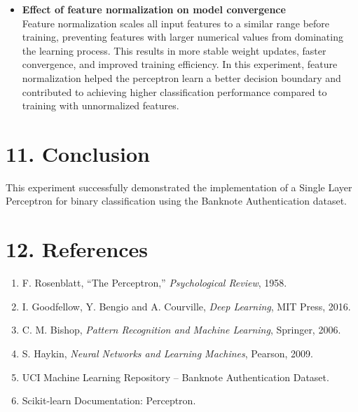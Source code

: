 \documentclass[11pt]{article}
\begin{document}
\begin{itemize}
    \item {\textbf{Effect of feature normalization on model convergence}}\\
    Feature normalization scales all input features to a similar range before training, preventing features with larger numerical values from dominating the learning process. This results in more stable weight updates, faster convergence, and improved training efficiency. In this experiment, feature normalization helped the perceptron learn a better decision boundary and contributed to achieving higher classification performance compared to training with unnormalized features.
\end{itemize}


\section*{11. Conclusion}

This experiment successfully demonstrated the implementation of a Single Layer Perceptron for binary classification using the Banknote Authentication dataset.

\section*{12. References}

\begin{enumerate}
\item F. Rosenblatt, ``The Perceptron,'' \emph{Psychological Review}, 1958.
\item I. Goodfellow, Y. Bengio and A. Courville, \emph{Deep Learning}, MIT Press, 2016.
\item C. M. Bishop, \emph{Pattern Recognition and Machine Learning}, Springer, 2006.
\item S. Haykin, \emph{Neural Networks and Learning Machines}, Pearson, 2009.
\item UCI Machine Learning Repository -- Banknote Authentication Dataset.
\item Scikit-learn Documentation: Perceptron.
\end{enumerate}
\end{document}

